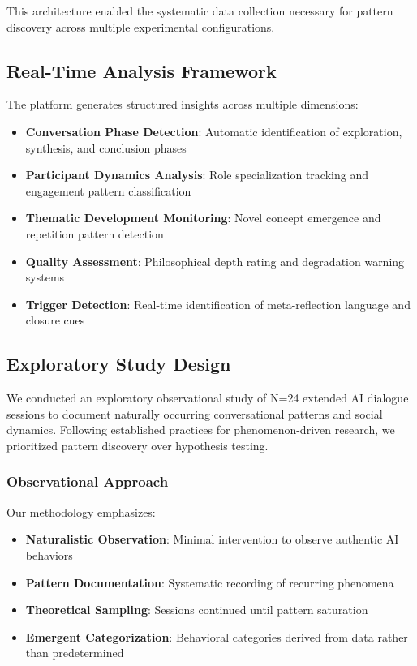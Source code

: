 \documentclass[11pt,letterpaper]{article}
\newcommand{\exponedataTotalSessionsRaw}{24}
\newcommand{\exponedataTotalSessions}{N=\exponedataTotalSessionsRaw}
\begin{document}
This architecture enabled the systematic data collection necessary for pattern discovery across multiple experimental configurations.

\subsection{Real-Time Analysis Framework}

The platform generates structured insights across multiple dimensions:

\begin{itemize}
    \item \textbf{Conversation Phase Detection}: Automatic identification of exploration, synthesis, and conclusion phases
    \item \textbf{Participant Dynamics Analysis}: Role specialization tracking and engagement pattern classification
    \item \textbf{Thematic Development Monitoring}: Novel concept emergence and repetition pattern detection
    \item \textbf{Quality Assessment}: Philosophical depth rating and degradation warning systems
    \item \textbf{Trigger Detection}: Real-time identification of meta-reflection language and closure cues
\end{itemize}

\subsection{Exploratory Study Design}

We conducted an exploratory observational study of \exponedataTotalSessions{} extended AI dialogue sessions to document naturally occurring conversational patterns and social dynamics. Following established practices for phenomenon-driven research, we prioritized pattern discovery over hypothesis testing.

\subsubsection{Observational Approach}
Our methodology emphasizes:
\begin{itemize}
    \item \textbf{Naturalistic Observation}: Minimal intervention to observe authentic AI behaviors
    \item \textbf{Pattern Documentation}: Systematic recording of recurring phenomena
    \item \textbf{Theoretical Sampling}: Sessions continued until pattern saturation
    \item \textbf{Emergent Categorization}: Behavioral categories derived from data rather than predetermined
\end{itemize}
\end{document}
